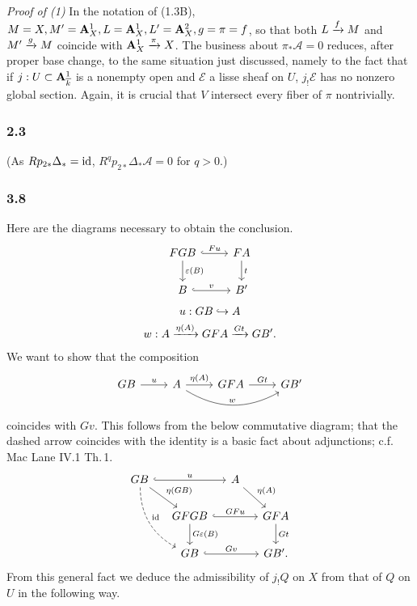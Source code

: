 \documentclass[deligne.tex]{subfiles}
\begin{document}
\emph{Proof of (1)}\quad
In the notation of (1.3B), $M=X,M'=\mathbf{A}^1_X,L=\mathbf{A}^1_X,L'=\mathbf{A}^2_X,g=\pi=f$, so
that both $L\xrightarrow fM$ and $M'\xrightarrow gM$ coincide with $\mathbf{A}^1_X\xrightarrow\pi X$.
The business about $\pi_*\mathcal A=0$ reduces, after proper base change,
to the same situation just discussed, namely to the fact that if 
$j:U\subset\mathbf{A}^1_{\overline k}$ is a nonempty open and $\mathcal E$ a lisse
sheaf on $U$, $j_!\mathcal E$ has no nonzero global section.
Again, it is crucial that $V$ intersect every fiber of $\pi$ nontrivially.

\subsubsection*{2.3} (As $Rp_{2*}\Delta_*=\operatorname{id}$,
$R^qp_{2*}\Delta_*\mathcal A=0$ for $q>0$.)

\subsubsection*{3.8} Here are the diagrams necessary to obtain the 
conclusion.
\begin{equation*}\begin{tikzcd}
	FGB\arrow[d,"\vep(B)"]\arrow[r,hook,"Fu"]&FA\arrow[d,"t"] \\
	B\arrow[r,hook,"v"]&B'
\end{tikzcd}\end{equation*}
\begin{gather*}
	u:GB\hookrightarrow A \\
	w:A\xrightarrow{\eta(A)}GFA\xrightarrow{Gt}GB'.
\end{gather*}
We want to show that the composition
\begin{equation*}\begin{tikzcd}
	GB\arrow[r,"u"]&A\arrow[r,"\eta(A)"]\arrow[rr,bend right,"w"]
	&GFA\arrow[r,"Gt"]&GB'
\end{tikzcd}\end{equation*}
coincides with $Gv$. This follows from the below commutative diagram;
that the dashed arrow coincides with the identity is a basic fact about 
adjunctions; c.f. Mac Lane IV.1 Th.\,1.
\begin{equation*}\begin{tikzcd}[column sep=small]
	GB\arrow[rr,hook,"u"]\arrow[dr,"\eta(GB)"]\arrow[ddr,dashed,bend right,"\id"]
	&&A\arrow[dr,"\eta(A)"] \\
	&GFGB\arrow[rr,hook,"GFu"]\arrow[d,"G\vep(B)"]
	&&GFA\arrow[d,"Gt"] \\
	&GB\arrow[rr,hook,"Gv"]&&GB'.
\end{tikzcd}\end{equation*}
From this general fact we deduce the admissibility of $j_!Q$ on $X$ from
that of $Q$ on $U$ in the following way.
\end{document}
